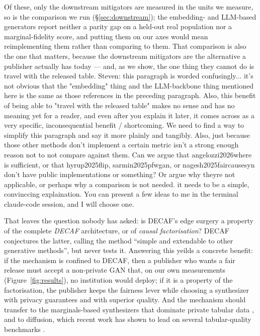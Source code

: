 \documentclass{article}
\newcommand{\s}[1]{\textcolor{Dandelion}{Steven: #1}}
\begin{document}
Of these, only the downstream mitigators are measured in the units we
measure, so \citet{angelozzi2026where} is the comparison we run
(\S\ref{sec:downstream}); the embedding- and LLM-based generators report
neither a parity gap on a held-out real population nor a marginal-fidelity
score, and putting them on our axes would mean reimplementing them rather
than comparing to them. That comparison is also the one that matters, because
the downstream mitigators are the alternative a publisher actually has today
--- and, as we show, the one thing they cannot do is travel with the released
table. \s{this paragraph is worded confusingly... it's not obvious that the "embedding" thing and the LLM-backbone thing mentioned here is the same as those references in the preceding paragraph. Also, this benefit of being able to "travel with the released
table" makes no sense and has no meaning yet for a reader, and even after you explain it later, it comes across as a very specific, inconsequential benefit / shortcoming. We need to find a way to simplify this paragraph and say it more plainly and tangibly. Also, just because those other methods don't implement a certain metric isn't a strong enough reason not to not compare against them. Can we argue that angelozzi2026where is sufficient, or that hyrup2025flip, sarmin2025pfwgan, or nagesh2025faircausesyn don't have public implementations or something? Or argue why theyre not applicable, or perhaps why a comparison is not needed. it needs to be a simple, convinccing explaination. You can present a few ideas to me in the terminal claude-code session, and I will choose one.}

That leaves the question nobody has asked: is DECAF's edge surgery a property
of the complete \emph{DECAF} architecture, or of \emph{causal factorisation}? DECAF conjectures the
latter, calling the method ``simple and extendable to other generative
methods'', but never tests it. Answering this yeilds a concrete benefit: if the
mechanism is confined to DECAF, then a publisher who wants a fair release
must accept a non-private GAN that, on our own measurements
(Figure~\ref{fig:results}), no institution would deploy; if it is a property
of the factorisation, the publisher keeps the fairness lever while choosing a
synthesizer with privacy guarantees and with superior quality. And the mechanism should transfer to
the marginals-based synthesizers that dominate private tabular data \citep{mckenna2021mst, mckenna2022aim, zhang2014privbayes, zhang2021privsyn}, and to diffusion, which recent
work has shown to lead on several tabular-quality benchmarks \citep{kotelnikov2023tabddpm}.
\end{document}
